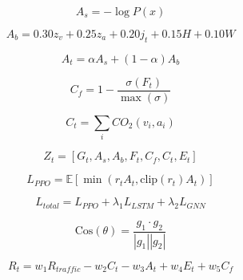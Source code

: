 
$$ A_s = -\log P(x) $$

$$ A_b = 0.30z_v + 0.25z_a + 0.20j_t + 0.15H + 0.10W $$

$$ A_t = \alpha A_s + (1-\alpha) A_b $$

$$ C_f = 1 - \frac{\sigma(F_t)}{\max(\sigma)} $$

$$ C_t = \sum_i CO_2(v_i, a_i) $$

$$ Z_t = [G_t, A_s, A_b, F_t, C_f, C_t, E_t] $$

$$ L_{PPO} = \mathbb{E}[\min(r_t A_t, \text{clip}(r_t) A_t)] $$

$$ L_{total} = L_{PPO} + \lambda_1 L_{LSTM} + \lambda_2 L_{GNN} $$

$$ \text{Cos}(\theta) = \frac{g_1 \cdot g_2}{|g_1| |g_2|} $$

$$ R_t = w_1 R_{traffic} - w_2 C_t - w_3 A_t + w_4 E_t + w_5 C_f $$
